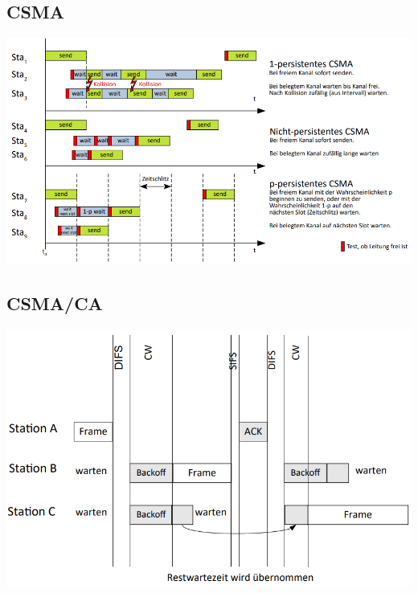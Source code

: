 \documentclass[12pt,a4paper]{article}
\begin{document}
		\subsection{CSMA}
			\begin{center}
				\includegraphics[width=\textwidth]{Bilder/csma.PNG}
			\end{center}

		\subsection{CSMA/CA}
			\begin{center}
				\includegraphics[width=\textwidth]{Bilder/csmaca.PNG}
			\end{center}

		\newpage
\end{document}

